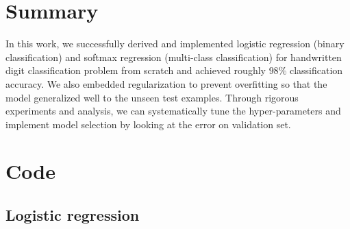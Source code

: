 \documentclass{article} %
\begin{document}
\section{Summary}
In this work, we successfully derived and implemented logistic regression (binary classification) and softmax regression (multi-class classification) for handwritten digit classification problem from scratch and achieved roughly $98\%$ classification accuracy. We also embedded regularization to prevent overfitting so that the model generalized well to the unseen test examples. Through rigorous experiments and analysis, we can systematically tune the hyper-parameters and implement model selection by looking at the error on validation set. 

\section{Code}
\subsection{Logistic regression}
\end{document}
